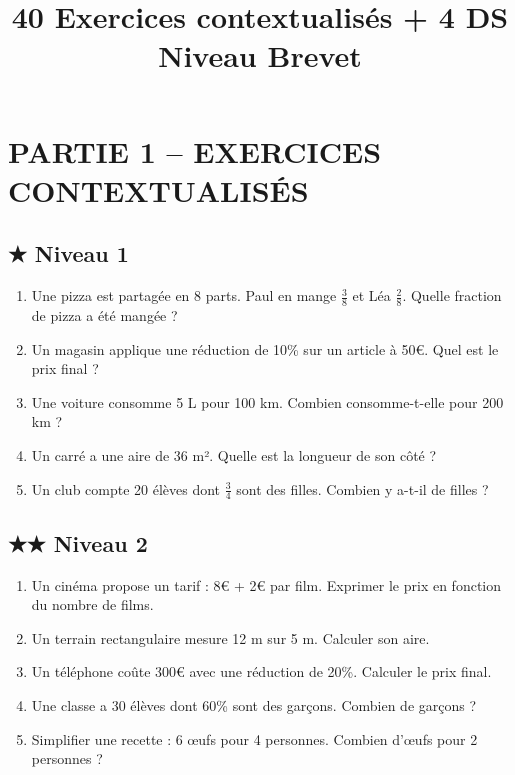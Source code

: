 \documentclass[11pt,a4paper]{article}
\title{\Huge 40 Exercices contextualisés + 4 DS \\ Niveau Brevet}
\date{}
\begin{document}
\maketitle

\section*{PARTIE 1 – EXERCICES CONTEXTUALISÉS}

\subsection*{★ Niveau 1}

\begin{enumerate}

\item Une pizza est partagée en 8 parts. Paul en mange $\frac{3}{8}$ et Léa $\frac{2}{8}$.  
Quelle fraction de pizza a été mangée ?

\item Un magasin applique une réduction de 10\% sur un article à 50€.  
Quel est le prix final ?

\item Une voiture consomme 5 L pour 100 km.  
Combien consomme-t-elle pour 200 km ?

\item Un carré a une aire de 36 m².  
Quelle est la longueur de son côté ?

\item Un club compte 20 élèves dont $\frac{3}{4}$ sont des filles.  
Combien y a-t-il de filles ?

\end{enumerate}

\subsection*{★★ Niveau 2}

\begin{enumerate}[resume]

\item Un cinéma propose un tarif : 8€ + 2€ par film.  
Exprimer le prix en fonction du nombre de films.

\item Un terrain rectangulaire mesure 12 m sur 5 m.  
Calculer son aire.

\item Un téléphone coûte 300€ avec une réduction de 20\%.  
Calculer le prix final.

\item Une classe a 30 élèves dont 60\% sont des garçons.  
Combien de garçons ?

\item Simplifier une recette : 6 œufs pour 4 personnes.  
Combien d’œufs pour 2 personnes ?

\end{enumerate}
\end{document}
